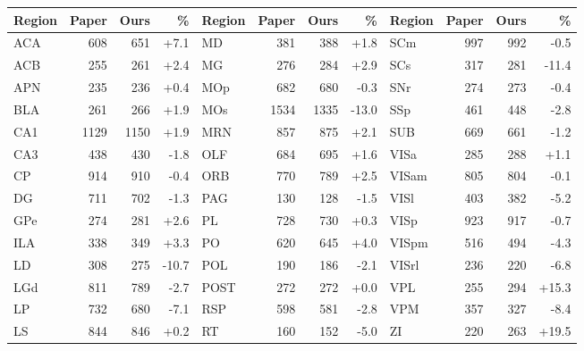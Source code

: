 \begin{tabular}{@{}lrrr@{\hspace{6mm}}lrrr@{\hspace{6mm}}lrrr@{}}
\toprule
Region & Paper & Ours & \% & Region & Paper & Ours & \% & Region & Paper & Ours & \% \\
\midrule
ACA & 608 & 651 & +7.1 & MD & 381 & 388 & +1.8 & SCm & 997 & 992 & -0.5 \\
ACB & 255 & 261 & +2.4 & MG & 276 & 284 & +2.9 & SCs & 317 & 281 & -11.4 \\
APN & 235 & 236 & +0.4 & MOp & 682 & 680 & -0.3 & SNr & 274 & 273 & -0.4 \\
BLA & 261 & 266 & +1.9 & MOs & 1534 & 1335 & -13.0 & SSp & 461 & 448 & -2.8 \\
CA1 & 1129 & 1150 & +1.9 & MRN & 857 & 875 & +2.1 & SUB & 669 & 661 & -1.2 \\
CA3 & 438 & 430 & -1.8 & OLF & 684 & 695 & +1.6 & VISa & 285 & 288 & +1.1 \\
CP & 914 & 910 & -0.4 & ORB & 770 & 789 & +2.5 & VISam & 805 & 804 & -0.1 \\
DG & 711 & 702 & -1.3 & PAG & 130 & 128 & -1.5 & VISl & 403 & 382 & -5.2 \\
GPe & 274 & 281 & +2.6 & PL & 728 & 730 & +0.3 & VISp & 923 & 917 & -0.7 \\
ILA & 338 & 349 & +3.3 & PO & 620 & 645 & +4.0 & VISpm & 516 & 494 & -4.3 \\
LD & 308 & 275 & -10.7 & POL & 190 & 186 & -2.1 & VISrl & 236 & 220 & -6.8 \\
LGd & 811 & 789 & -2.7 & POST & 272 & 272 & +0.0 & VPL & 255 & 294 & +15.3 \\
LP & 732 & 680 & -7.1 & RSP & 598 & 581 & -2.8 & VPM & 357 & 327 & -8.4 \\
LS & 844 & 846 & +0.2 & RT & 160 & 152 & -5.0 & ZI & 220 & 263 & +19.5 \\
\bottomrule
\end{tabular}
